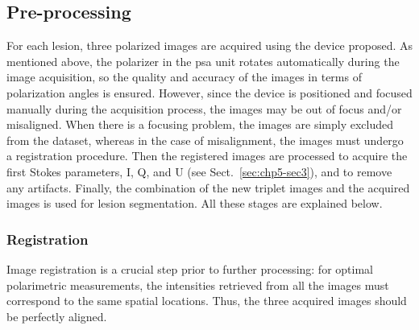 \subsection{Pre-processing}
For each lesion, three polarized images are acquired using the device proposed.
As mentioned above, the polarizer in the \ac{psa} unit rotates automatically during the image acquisition, so the quality and accuracy of the images in terms of polarization angles is ensured.
However, since the device is positioned and focused manually during the acquisition process, the images may be out of focus and/or misaligned.
When there is a focusing problem, the images are simply excluded from the dataset, whereas in the case of misalignment, the images must undergo a registration procedure.
Then the registered images are processed to acquire the first Stokes parameters, I, Q, and U (see Sect.~\ref{sec:chp5-sec3}), and to remove any artifacts.
Finally, the combination of the new triplet images and the acquired images is used for lesion segmentation.
All these stages are explained below.

\subsubsection{Registration}

Image registration is a crucial step prior to further processing: for optimal polarimetric measurements, the intensities retrieved from all the images must correspond to the same spatial locations.
Thus, the three acquired images should be perfectly aligned.

